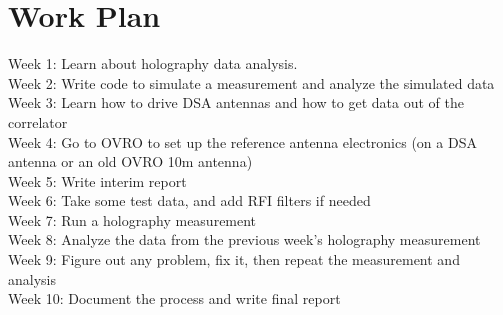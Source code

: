 \documentclass[12pt]{extarticle} %
\begin{document}
 

\section{Work Plan}
Week 1: Learn about holography data analysis.\\
Week 2: Write code to simulate a measurement and analyze the simulated data\\
Week 3: Learn how to drive DSA antennas and how to get data out of the correlator \\
Week 4: Go to OVRO to set up the reference antenna electronics (on a DSA antenna or an old OVRO 10m antenna)\\
Week 5: Write interim report\\
Week 6: Take some test data, and add RFI filters if needed\\
Week 7: Run a holography measurement\\
Week 8: Analyze the data from the previous week's holography measurement\\
Week 9: Figure out any problem, fix it, then repeat the measurement and analysis\\
Week 10: Document the process and write final report\\

\printbibliography[heading=bibintoc,title={References}] 
\end{document}

